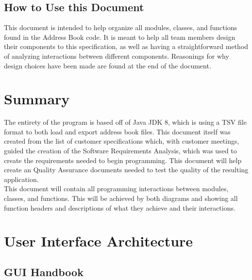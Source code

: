 \documentclass[a4paper, 11pt]{article}
\begin{document}
\subsection{How to Use this Document}
This document is intended to help organize all modules, classes, and functions found in the Address Book code. It is meant to help all team members design their components to this specification, as well as having a straightforward method of analyzing interactions between different components. Reasonings for why design choices have been made are found at the end of the document.
\section{Summary}
The entirety of the program is based off of Java JDK 8, which is using a TSV file format to both load and export address book files. This document itself was created from the list of customer specifications which, with customer meetings, guided the creation of the Software Requirements Analysis, which was used to create the requirements needed to begin programming. This document will help create an Quality Assurance documents needed to test the quality of the resulting application. \\
This document will contain all programming interactions between modules, classes, and functions. This will be achieved by both diagrams and showing all function headers and descriptions of what they achieve and their interactions.
\section{User Interface Architecture}
\subsection{GUI Handbook}
\end{document}
